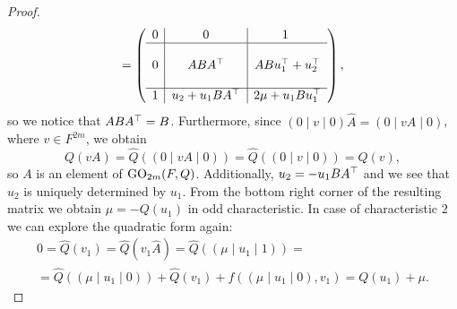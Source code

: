 \begin{proof}
    \begin{equation*}
	= \left(
	    \begin{array}{c|c|c}
		0 & 0 & 1\ \\ \hline
		& & \\
		0 &\ \ \ \ ABA^\top\ \ \ \ & ABu_1^\top + u_2^\top \\
		& & \\ \hline
		1 & u_2+u_1 BA^\top & 2\mu + u_1 B u_1^\top
	    \end{array}
	\right),
    \end{equation*}
    so we notice that $ABA^\top = B$. Furthermore, since
    $(0\mid v \mid 0) \hat{A} = (0 \mid vA \mid 0)$, where $v \in F^{2m}$, we obtain
    \begin{equation*}
	Q(vA) = \hat{Q}((0 \mid vA \mid 0) ) = \hat{Q}((0 \mid v \mid 0) ) =
	    Q(v),
    \end{equation*}
    so $A$ is an element of $\mathrm{GO}_{2m}(F,Q)$.
    Additionally, $u_2 = -u_1BA^\top$ and we see that $u_2$ is uniquely determined by $u_1$. 
    From the bottom right corner of the resulting matrix we obtain
    $\mu = -Q(u_1)$ in odd characteristic. In case of characteristic $2$ we can 
    explore the quadratic form again:
    \begin{multline*}
	0 = \hat{Q}(v_1) = \hat{Q}(v_1 \hat{A}) = \hat{Q}( (\mu \mid u_1 \mid 1) ) = \\
	= \hat{Q}( (\mu \mid u_1 \mid 0) ) + \hat{Q}(v_1) + f( (\mu\mid u_1 \mid 0), v_1)
	= Q(u_1) + \mu.
    \end{multline*}
    

\end{proof}
